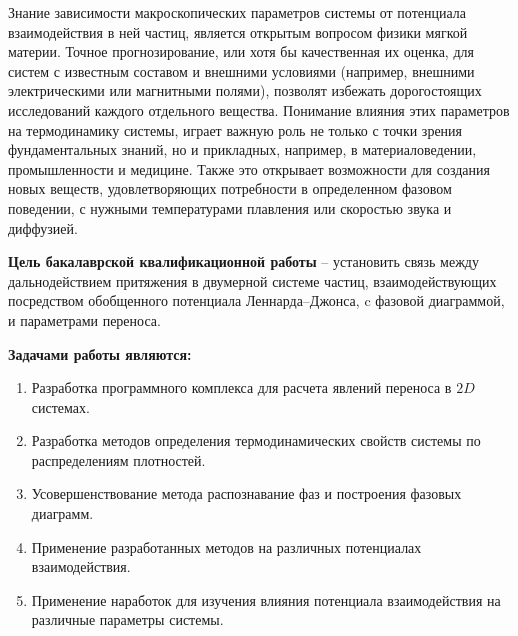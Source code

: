 Знание зависимости макроскопических параметров системы от потенциала взаимодействия в ней частиц, является открытым вопросом физики мягкой материи. Точное прогнозирование, или хотя бы качественная их оценка, для систем с известным составом и внешними условиями (например, внешними электрическими или магнитными полями), позволят избежать дорогостоящих исследований каждого отдельного вещества. Понимание влияния этих параметров на термодинамику системы, играет важную роль не только с точки зрения фундаментальных знаний, но и прикладных, например, в материаловедении, промышленности и медицине.
Также это открывает возможности для создания новых веществ, удовлетворяющих потребности в определенном фазовом поведении, с нужными температурами плавления или скоростью звука и диффузией.

\newpage

\textbf{Цель бакалаврской квалификационной работы} --
установить связь между дальнодействием притяжения в двумерной системе частиц, взаимодействующих посредством обобщенного потенциала Леннарда--Джонса, c фазовой диаграммой, и параметрами переноса.

\textbf{Задачами работы являются:}
\begin{enumerate}
\item Разработка программного комплекса для расчета явлений переноса в $2D$ системах.
\item Разработка методов определения термодинамических свойств системы по распределениям плотностей. 
\item Усовершенствование метода распознавание фаз и построения фазовых диаграмм.
\item Применение разработанных методов на различных потенциалах взаимодействия.
\item Применение наработок для изучения влияния потенциала взаимодействия на различные параметры системы.
\end{enumerate}
